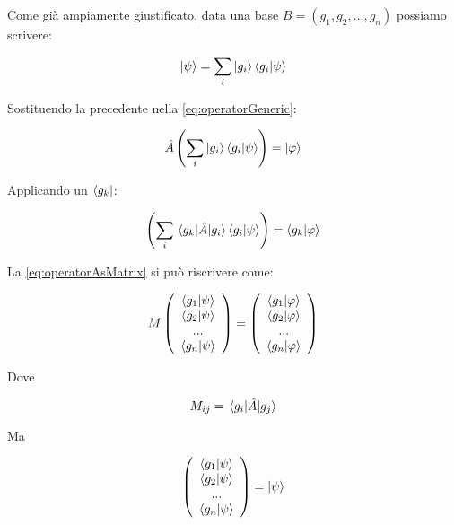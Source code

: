 Come già ampiamente giustificato, data una base $B = (g_1, g_2, ..., g_n)$ possiamo scrivere:

	\begin{equation}
		\ket{\psi} = \sum_i \ket{g_i} \braket{g_i}{\psi}
	\end{equation}

Sostituendo la precedente nella \eqref{eq:operatorGeneric}:

	\begin{equation}
		\hat{A} \left ( \sum_i \ket{g_i} \braket{g_i}{\psi} \right ) = \ket{\varphi}
	\end{equation}

Applicando un $\bra{g_k}$:

	\begin{equation} \label{eq:operatorAsMatrix}
		\left ( \sum_i \mel{g_k}{\hat{A}}{g_i} \braket{g_i}{\psi} \right ) = \braket{g_k}{\varphi}
	\end{equation}

La \eqref{eq:operatorAsMatrix} si può riscrivere come:

	\begin{equation}
		M \left ( \begin{array}{c}
				\braket{g_1}{\psi} \\
				\braket{g_2}{\psi} \\
				... \\
				\braket{g_n}{\psi} \\
			\end{array}
		\right ) = \left ( \begin{array}{c}
				\braket{g_1}{\varphi} \\
				\braket{g_2}{\varphi} \\
				... \\
				\braket{g_n}{\varphi} \\
			\end{array}
		\right )
	\end{equation}

Dove

	\begin{equation}
		M_{ij} = \mel{g_i}{\hat{A}}{g_j} 
	\end{equation}

Ma

	\begin{equation}
		\left ( \begin{array}{c}
				\braket{g_1}{\psi} \\
				\braket{g_2}{\psi} \\
				... \\
				\braket{g_n}{\psi} \\
			\end{array}
		\right ) = \ket{\psi}
	\end{equation}

